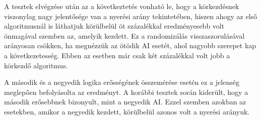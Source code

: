 A tesztek elvégzése után az a következtetés vonható le, hogy a körkezdésnek viszonylag nagy jelentősége van a nyerési arány tekintetében, hiszen ahogy az első algoritmusnál is láthatjuk körülbelül öt százalékkal eredményesebb volt önmagával szemben az, amelyik kezdett. Ez a randomizálás visszaszorulásával arányosan csökken, ha megnézzük az ötödik AI esetét, ahol nagyobb szerepet kap a következetesség. Ebben az esetben már csak két százalékkal volt jobb a körkezdő algoritmus.

A második és a negyedik logika erősségének összemérése esetén ez a jelenség meglepően befolyásolta az eredményt. A korábbi tesztek során kiderült, hogy a második erősebbnek bizonyult, mint a negyedik AI. Ezzel szemben azokban az esetekben, amikor a negyedik kezdett, körülbelül azonos volt a nyerési arányuk.

